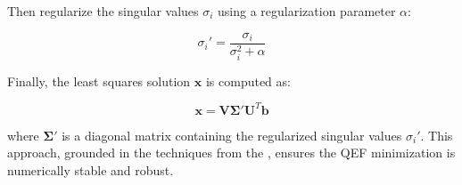 \noindent Then regularize the singular values \( \sigma_i \) using a regularization parameter \( \alpha \):

\begin{equation}
\sigma_i' = \frac{\sigma_i}{\sigma_i^2 + \alpha}
\label{eq:regularized_singular_values}
\end{equation}

\noindent Finally, the least squares solution \( \mathbf{x} \) is computed as:

\begin{equation}
\mathbf{x} = \mathbf{V} \mathbf{\Sigma'} \mathbf{U}^T \mathbf{b}
\end{equation}

\noindent where \( \mathbf{\Sigma'} \) is a diagonal matrix containing the regularized singular values \( \sigma_i' \). This approach, grounded in the techniques from the \cite{Press_2007}, ensures the QEF minimization is numerically stable and robust.








